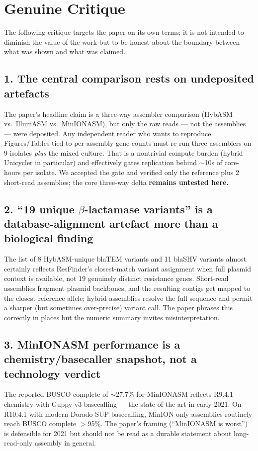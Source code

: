\documentclass[11pt,letterpaper]{article}
\begin{document}
\section{Genuine Critique}
\label{sec:critique}
The following critique targets the paper on its own terms; it is not intended to diminish the value of the work but to be honest about the boundary between what was shown and what was claimed.

\subsection*{1. The central comparison rests on undeposited artefacts}
The paper's headline claim is a three-way assembler comparison (HybASM vs.\ IllumASM vs.\ MinIONASM), but only the raw reads --- not the assemblies --- were deposited. Any independent reader who wants to reproduce Figures/Tables tied to per-assembly gene counts must re-run three assemblers on 9 isolates \textit{plus} the mixed culture. That is a nontrivial compute burden (hybrid Unicycler in particular) and effectively gates replication behind $\sim$10s of core-hours per isolate. We accepted the gate and verified only the reference plus 2 short-read assemblies; the core three-way delta \textbf{remains untested here.}

\subsection*{2. ``19 unique $\beta$-lactamase variants'' is a database-alignment artefact more than a biological finding}
The list of 8 HybASM-unique blaTEM variants and 11 blaSHV variants almost certainly reflects ResFinder's closest-match variant assignment when full plasmid context is available, not 19 genuinely distinct resistance genes. Short-read assemblies fragment plasmid backbones, and the resulting contigs get mapped to the closest reference allele; hybrid assemblies resolve the full sequence and permit a sharper (but sometimes over-precise) variant call. The paper phrases this correctly in places but the numeric summary invites misinterpretation.

\subsection*{3. MinIONASM performance is a chemistry/basecaller snapshot, not a technology verdict}
The reported BUSCO complete of $\sim$27.7\% for MinIONASM reflects R9.4.1 chemistry with Guppy v3 basecalling --- the state of the art in early 2021. On R10.4.1 with modern Dorado SUP basecalling, MinION-only assemblies routinely reach BUSCO complete $>$95\%. The paper's framing (``MinIONASM is worst'') is defensible for 2021 but should not be read as a durable statement about long-read-only assembly in general.
\end{document}
